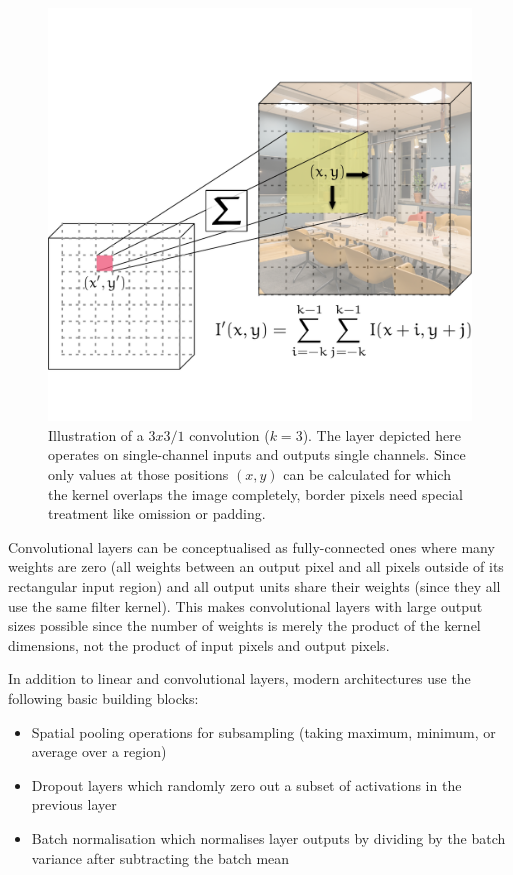 \begin{figure}
    \centering
    \includegraphics[max width=.7\textwidth]{gfx/diagrams/neural_network/convolution.pdf}
    \caption[Illustration of a $3x3/1$ convolution.]{Illustration of a $3x3/1$
        convolution ($k=3$). The layer depicted here operates on single-channel inputs and
    outputs single channels. Since only values at those positions $(x,y)$ can be calculated
    for which the kernel overlaps the image completely, border pixels need special treatment
    like omission or padding.}
    \label{fig:conv-layer}
\end{figure}

Convolutional layers can be conceptualised as fully-connected ones where many
weights are zero (all weights between an output pixel and all pixels outside of
its rectangular input region) and all output units share their weights (since
they all use the same filter kernel). This makes convolutional layers with large
output sizes possible since the number of weights is merely the product of the
kernel dimensions, not the product of input pixels and output pixels.

In addition to linear and convolutional layers, modern architectures use the
following basic building blocks:
\begin{itemize}
    \item Spatial pooling operations for subsampling (taking maximum, minimum, or average over a region)
    \item Dropout layers which randomly zero out a subset of activations in the
        previous layer
    \item Batch normalisation which normalises layer outputs by dividing by the
        batch variance after subtracting the batch mean
\end{itemize}


